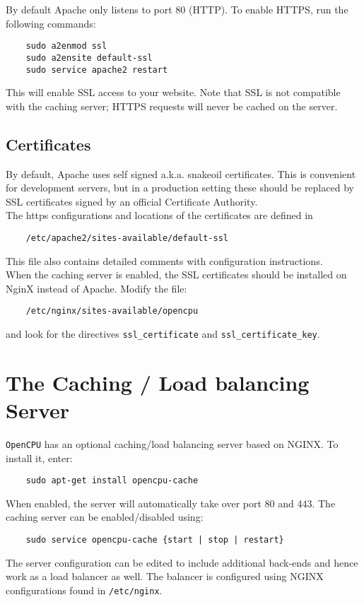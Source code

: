 \documentclass{scrartcl}
\begin{document}
By default Apache only listens to port 80 (HTTP). To enable HTTPS, run the
following commands:

\begin{verbatim}
    sudo a2enmod ssl
    sudo a2ensite default-ssl
    sudo service apache2 restart
\end{verbatim}
This will enable SSL access to your website. Note that SSL is not compatible
with the caching server; HTTPS requests will never be cached on the server.

\subsection{Certificates}
By default, Apache uses self signed a.k.a. snakeoil certificates. This is
convenient for development servers, but in a production setting these should be
replaced by SSL certificates signed by an official Certificate Authority. \\

\noindent The https configurations and locations of the certificates are defined
in

\begin{verbatim}
    /etc/apache2/sites-available/default-ssl
\end{verbatim}
This file also contains detailed comments with configuration instructions. \\

\noindent When the caching server is enabled, the SSL certificates should be
installed on NginX instead of Apache. Modify the file: 

\begin{verbatim}
    /etc/nginx/sites-available/opencpu
\end{verbatim}
and look for the directives \texttt{ssl\_certificate} and
\texttt{ssl\_certificate\_key}.

\section{The Caching / Load balancing Server}

\texttt{OpenCPU} has an optional caching/load balancing server based on NGINX.
To install it, enter:

\begin{verbatim}
    sudo apt-get install opencpu-cache
\end{verbatim}
When enabled, the server will automatically take over port 80 and 443. The
caching server can be enabled/disabled using:

\begin{verbatim}
    sudo service opencpu-cache {start | stop | restart}
\end{verbatim}
The server configuration can be edited to include additional back-ends and hence
work as a load balancer as well. The balancer is configured using NGINX
configurations found in \texttt{/etc/nginx}.
\end{document}
